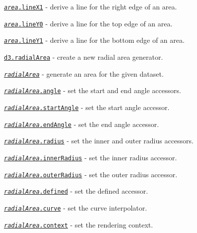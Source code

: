 \begin{DoxyItemize}
\item \href{https://github.com/d3/d3-shape/blob/master/README.md#area_lineX1}{\tt {\itshape area}.line\+X1} -\/ derive a line for the right edge of an area.
\item \href{https://github.com/d3/d3-shape/blob/master/README.md#area_lineY0}{\tt {\itshape area}.line\+Y0} -\/ derive a line for the top edge of an area.
\item \href{https://github.com/d3/d3-shape/blob/master/README.md#area_lineY1}{\tt {\itshape area}.line\+Y1} -\/ derive a line for the bottom edge of an area.
\item \href{https://github.com/d3/d3-shape/blob/master/README.md#radialArea}{\tt d3.\+radial\+Area} -\/ create a new radial area generator.
\item \href{https://github.com/d3/d3-shape/blob/master/README.md#_radialArea}{\tt {\itshape radial\+Area}} -\/ generate an area for the given dataset.
\item \href{https://github.com/d3/d3-shape/blob/master/README.md#radialArea_angle}{\tt {\itshape radial\+Area}.angle} -\/ set the start and end angle accessors.
\item \href{https://github.com/d3/d3-shape/blob/master/README.md#radialArea_startAngle}{\tt {\itshape radial\+Area}.start\+Angle} -\/ set the start angle accessor.
\item \href{https://github.com/d3/d3-shape/blob/master/README.md#radialArea_endAngle}{\tt {\itshape radial\+Area}.end\+Angle} -\/ set the end angle accessor.
\item \href{https://github.com/d3/d3-shape/blob/master/README.md#radialArea_radius}{\tt {\itshape radial\+Area}.radius} -\/ set the inner and outer radius accessors.
\item \href{https://github.com/d3/d3-shape/blob/master/README.md#radialArea_innerRadius}{\tt {\itshape radial\+Area}.inner\+Radius} -\/ set the inner radius accessor.
\item \href{https://github.com/d3/d3-shape/blob/master/README.md#radialArea_outerRadius}{\tt {\itshape radial\+Area}.outer\+Radius} -\/ set the outer radius accessor.
\item \href{https://github.com/d3/d3-shape/blob/master/README.md#radialArea_defined}{\tt {\itshape radial\+Area}.defined} -\/ set the defined accessor.
\item \href{https://github.com/d3/d3-shape/blob/master/README.md#radialArea_curve}{\tt {\itshape radial\+Area}.curve} -\/ set the curve interpolator.
\item \href{https://github.com/d3/d3-shape/blob/master/README.md#radialArea_context}{\tt {\itshape radial\+Area}.context} -\/ set the rendering context.

\end{DoxyItemize}
